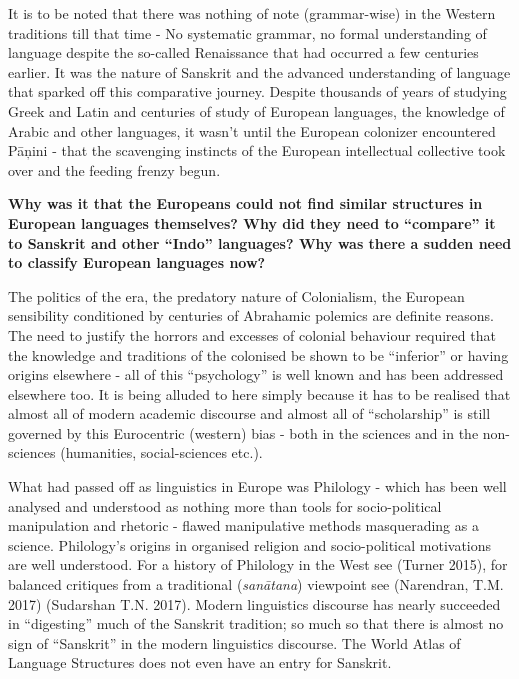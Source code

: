 \vskip 4pt

It is to be noted that there was nothing of note (grammar-wise) in the Western traditions till that time - No systematic grammar, no formal understanding of language despite the so-called Renaissance that had occurred a few centuries earlier. It was the nature of Sanskrit and the advanced understanding of language that sparked off this comparative journey. Despite thousands of years of studying Greek and Latin and centuries of study of European languages, the knowledge of Arabic and other languages, it wasn’t until the European colonizer encountered Pāņini - that the scavenging instincts of the European intellectual collective took over and the feeding frenzy begun.

\vskip 4pt

\textbf{Why was it that the Europeans could not find similar structures in European languages themselves? Why did they need to “compare” it to Sanskrit and other “Indo” languages? Why was there a sudden need to classify European languages now?}

The politics of the era, the predatory nature of Colonialism, the European sensibility conditioned by centuries of Abrahamic polemics are definite reasons. The need to justify the horrors and excesses of colonial behaviour required that the knowledge and traditions of the colonised be shown to be “inferior” or having origins elsewhere - all of this “psychology” is well known and has been addressed elsewhere too. It is being alluded to here simply because it has to be realised that almost all of modern academic discourse and almost all of “scholarship” is still governed by this Eurocentric (western) bias - both in the sciences and in the non-sciences (humanities, social-sciences etc.).

What had passed off as linguistics in Europe was Philology - which has been well analysed and understood as nothing more than tools for socio-political manipulation and rhetoric - flawed manipulative methods masquerading as a science. Philology’s origins in organised religion and socio-political motivations are well understood. For a history of Philology in the West see (Turner 2015), for balanced critiques from a traditional (\textit{sanātana}) viewpoint see (Narendran, T.M. 2017) (Sudarshan T.N. 2017). Modern linguistics discourse has nearly succeeded in “digesting” much of the Sanskrit tradition; so much so that there is almost no sign of “Sanskrit” in the modern linguistics discourse. The World Atlas of Language Structures does not even have an entry for Sanskrit.


